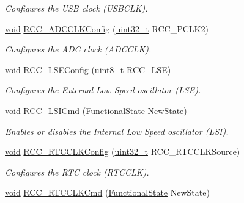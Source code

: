 \begin{DoxyCompactItemize}
\begin{DoxyCompactList}\small\item\em Configures the U\+SB clock (U\+S\+B\+C\+LK). \end{DoxyCompactList}\item 
\hyperlink{usb__devapi_8h_afabf60e7f57651d6d595a02c75f07cd0}{void} \hyperlink{group___r_c_c___private___functions_gadda89cdb838bf49e5fa10f3f774530a4}{R\+C\+C\+\_\+\+A\+D\+C\+C\+L\+K\+Config} (\hyperlink{_p_e___types_8h_a33594304e786b158f3fb30289278f5af}{uint32\+\_\+t} R\+C\+C\+\_\+\+P\+C\+L\+K2)
\begin{DoxyCompactList}\small\item\em Configures the A\+DC clock (A\+D\+C\+C\+LK). \end{DoxyCompactList}\item 
\hyperlink{usb__devapi_8h_afabf60e7f57651d6d595a02c75f07cd0}{void} \hyperlink{group___r_c_c___private___functions_ga65209ab5c3589b249c7d70f978735ca6}{R\+C\+C\+\_\+\+L\+S\+E\+Config} (\hyperlink{_p_e___types_8h_aba7bc1797add20fe3efdf37ced1182c5}{uint8\+\_\+t} R\+C\+C\+\_\+\+L\+SE)
\begin{DoxyCompactList}\small\item\em Configures the External Low Speed oscillator (L\+SE). \end{DoxyCompactList}\item 
\hyperlink{usb__devapi_8h_afabf60e7f57651d6d595a02c75f07cd0}{void} \hyperlink{group___r_c_c___private___functions_ga81e3ca29fd154ac2019bba6936d6d5ed}{R\+C\+C\+\_\+\+L\+S\+I\+Cmd} (\hyperlink{agilefox_2library_2inc_2stm32f10x__type_8h_ac9a7e9a35d2513ec15c3b537aaa4fba1}{Functional\+State} New\+State)
\begin{DoxyCompactList}\small\item\em Enables or disables the Internal Low Speed oscillator (L\+SI). \end{DoxyCompactList}\item 
\hyperlink{usb__devapi_8h_afabf60e7f57651d6d595a02c75f07cd0}{void} \hyperlink{group___r_c_c___private___functions_ga1473d8a5a020642966359611c44181b0}{R\+C\+C\+\_\+\+R\+T\+C\+C\+L\+K\+Config} (\hyperlink{_p_e___types_8h_a33594304e786b158f3fb30289278f5af}{uint32\+\_\+t} R\+C\+C\+\_\+\+R\+T\+C\+C\+L\+K\+Source)
\begin{DoxyCompactList}\small\item\em Configures the R\+TC clock (R\+T\+C\+C\+LK). \end{DoxyCompactList}\item 
\hyperlink{usb__devapi_8h_afabf60e7f57651d6d595a02c75f07cd0}{void} \hyperlink{group___r_c_c___private___functions_ga9802f84846df2cea8e369234ed13b159}{R\+C\+C\+\_\+\+R\+T\+C\+C\+L\+K\+Cmd} (\hyperlink{agilefox_2library_2inc_2stm32f10x__type_8h_ac9a7e9a35d2513ec15c3b537aaa4fba1}{Functional\+State} New\+State)

\end{DoxyCompactItemize}
